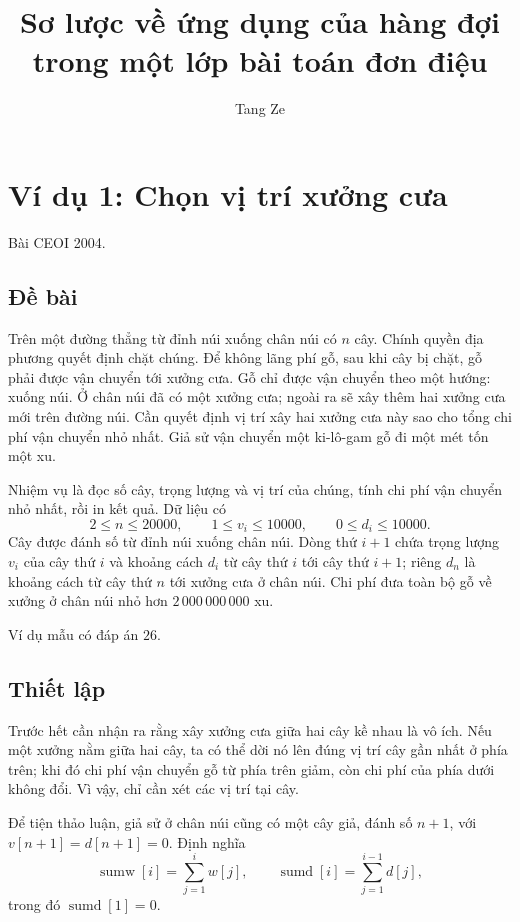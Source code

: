 \documentclass[11pt]{article}
\title{Sơ lược về ứng dụng của hàng đợi trong một lớp bài toán đơn điệu}
\author{Tang Ze}
\date{}
\begin{document}
\maketitle


\section{Ví dụ 1: Chọn vị trí xưởng cưa}

Bài CEOI 2004.

\subsection*{Đề bài}

Trên một đường thẳng từ đỉnh núi xuống chân núi có $n$ cây. Chính quyền địa
phương quyết định chặt chúng. Để không lãng phí gỗ, sau khi cây bị chặt, gỗ
phải được vận chuyển tới xưởng cưa. Gỗ chỉ được vận chuyển theo một hướng:
xuống núi. Ở chân núi đã có một xưởng cưa; ngoài ra sẽ xây thêm hai xưởng
cưa mới trên đường núi. Cần quyết định vị trí xây hai xưởng cưa này sao cho
tổng chi phí vận chuyển nhỏ nhất. Giả sử vận chuyển một ki-lô-gam gỗ đi một
mét tốn một xu.

Nhiệm vụ là đọc số cây, trọng lượng và vị trí của chúng, tính chi phí vận
chuyển nhỏ nhất, rồi in kết quả. Dữ liệu có
\[
  2\le n\le 20000,\qquad
  1\le v_i\le 10000,\qquad
  0\le d_i\le 10000.
\]
Cây được đánh số từ đỉnh núi xuống chân núi. Dòng thứ $i+1$ chứa trọng lượng
$v_i$ của cây thứ $i$ và khoảng cách $d_i$ từ cây thứ $i$ tới cây thứ
$i+1$; riêng $d_n$ là khoảng cách từ cây thứ $n$ tới xưởng cưa ở chân núi.
Chi phí đưa toàn bộ gỗ về xưởng ở chân núi nhỏ hơn $2\,000\,000\,000$ xu.

Ví dụ mẫu có đáp án $26$.

\subsection*{Thiết lập}

Trước hết cần nhận ra rằng xây xưởng cưa giữa hai cây kề nhau là vô ích. Nếu
một xưởng nằm giữa hai cây, ta có thể dời nó lên đúng vị trí cây gần nhất ở
phía trên; khi đó chi phí vận chuyển gỗ từ phía trên giảm, còn chi phí của
phía dưới không đổi. Vì vậy, chỉ cần xét các vị trí tại cây.

Để tiện thảo luận, giả sử ở chân núi cũng có một cây giả, đánh số $n+1$, với
$v[n+1]=d[n+1]=0$. Định nghĩa
\[
  \operatorname{sumw}[i]=\sum_{j=1}^{i} w[j],
  \qquad
  \operatorname{sumd}[i]=\sum_{j=1}^{i-1} d[j],
\]
trong đó $\operatorname{sumd}[1]=0$.
\end{document}
